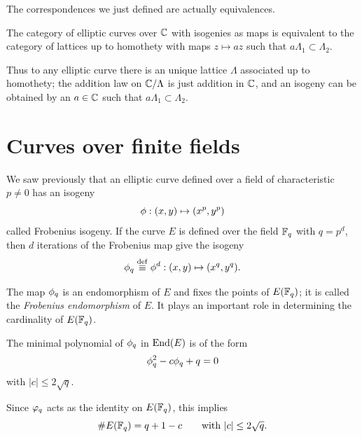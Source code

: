 The correspondences we just defined are actually equivalences.

\begin{theorem}
  The category of elliptic curves over $\mathbb{C}$ with isogenies as maps is
  equivalent to the category of lattices up to homothety with maps
  $z\mapsto az$ such that $a\Lambda_1\subset\Lambda_2$.
\end{theorem}

Thus to any elliptic curve there is an unique lattice $\Lambda$
associated up to homothety; the addition law on $\mathbb{C}/\Lambda$ is just
addition in $\mathbb{C}$, and an isogeny can be obtained by an $a\in\mathbb{C}$ such
that $a\Lambda_1\subset\Lambda_2$.



\section{Curves over finite fields}
\label{sec:curves-over-finite}
We saw previously that an elliptic curve defined over a field of
characteristic $p\ne0$ has an isogeny
\begin{equation}
  \label{eq:150}
  \phi:(x,y)\mapsto(x^p,y^p)
\end{equation}
called Frobenius isogeny. If the curve $E$ is defined over the field
$\mathbb{F}_q$ with $q=p^d$, then $d$ iterations of the Frobenius map give the
isogeny
\begin{equation}
  \label{eq:151}
  \phi_q\overset{\mathrm{def}}{\equiv}\phi^d:(x,y)\mapsto(x^q,y^q)
  \text{.}
\end{equation}

The map $\phi_q$ is an endomorphism of $E$ and fixes the points
of $E(\mathbb{F}_q)$; it is called the \emph{Frobenius
  endomorphism} of $E$. It plays an important role in
determining the cardinality of $E(\mathbb{F}_q)$.

\begin{theorem}[Hasse]
  The minimal polynomial of $\phi_q$ in $\operatorname{End}(E)$ is of the form
  \begin{equation}
    \label{eq:152}
    \phi_q^2 - c\phi_q + q = 0
  \end{equation}
  with $\lvert c\rvert\le2\sqrt{q}$.
\end{theorem}

Since $\varphi_q$ acts as the identity on $E(\mathbb{F}_q)$, this implies
\begin{equation}
  \label{eq:153}
  \# E(\mathbb{F}_q) = q+1-c
  \qquad\text{with } \lvert c\rvert\le2\sqrt{q}
  \text{.}
\end{equation}

